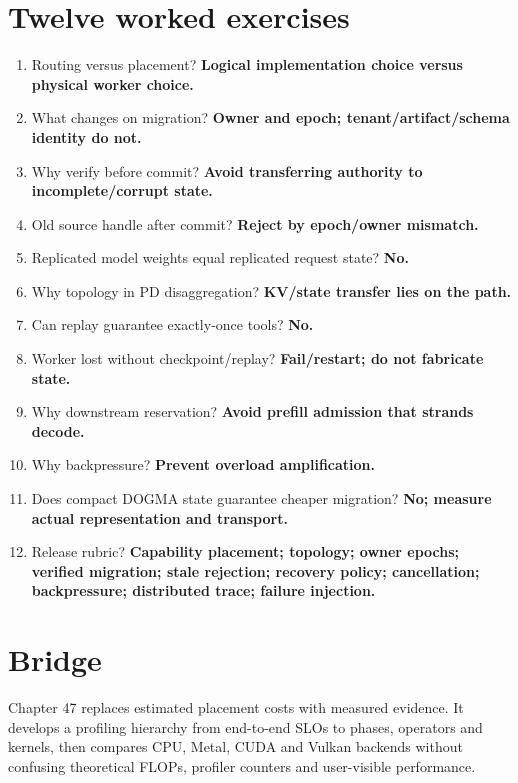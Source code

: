 \section{Twelve worked exercises}
\begin{enumerate}
\item Routing versus placement? \textbf{Logical implementation choice versus physical worker choice.}
\item What changes on migration? \textbf{Owner and epoch; tenant/artifact/schema identity do not.}
\item Why verify before commit? \textbf{Avoid transferring authority to incomplete/corrupt state.}
\item Old source handle after commit? \textbf{Reject by epoch/owner mismatch.}
\item Replicated model weights equal replicated request state? \textbf{No.}
\item Why topology in PD disaggregation? \textbf{KV/state transfer lies on the path.}
\item Can replay guarantee exactly-once tools? \textbf{No.}
\item Worker lost without checkpoint/replay? \textbf{Fail/restart; do not fabricate state.}
\item Why downstream reservation? \textbf{Avoid prefill admission that strands decode.}
\item Why backpressure? \textbf{Prevent overload amplification.}
\item Does compact DOGMA state guarantee cheaper migration? \textbf{No; measure actual representation and transport.}
\item Release rubric? \textbf{Capability placement; topology; owner epochs; verified migration; stale rejection; recovery policy; cancellation; backpressure; distributed trace; failure injection.}
\end{enumerate}

\section{Bridge}
Chapter 47 replaces estimated placement costs with measured evidence. It develops a profiling hierarchy from end-to-end SLOs to phases, operators and kernels, then compares CPU, Metal, CUDA and Vulkan backends without confusing theoretical FLOPs, profiler counters and user-visible performance.
